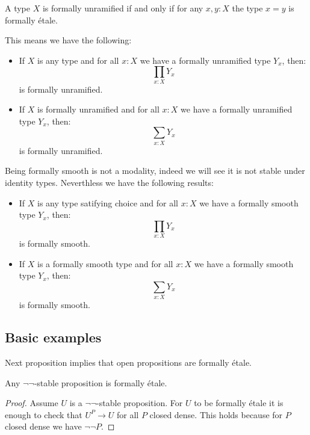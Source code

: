 \begin{lemma}
A type $X$ is formally unramified if and only if for any $x,y:X$ the type $x=y$ is formally étale.
\end{lemma}

This means we have the following:

\begin{proposition}
\begin{itemize}
\item If $X$ is any type and for all $x:X$ we have a formally unramified type $Y_x$, then:
\[\prod_{x:X}Y_x\]
is formally unramified. 
\item  If $X$ is formally unramified and for all $x:X$ we have a formally unramified type $Y_x$, then:
\[\sum_{x:X}Y_x\]
is formally unramified.
\end{itemize}
\end{proposition}

Being formally smooth is not a modality, indeed we will see it is not stable under identity types. Neverthless we have the following results:

\begin{lemma}
\begin{itemize}
\item If $X$ is any type satifying choice and for all $x:X$ we have a formally smooth type $Y_x$, then:
\[\prod_{x:X}Y_x\]
is formally smooth.
\item If $X$ is a formally smooth type and for all $x:X$ we have a formally smooth type $Y_x$, then:
\[\sum_{x:X}Y_x\]
is formally smooth.
\end{itemize}
\end{lemma}


\subsection{Basic examples}

Next proposition implies that open propositions are formally étale.

\begin{lemma}\label{not-not-stable-prop-etale}
  Any $\neg\neg$-stable proposition is formally étale.
\end{lemma}

\begin{proof}
  Assume $U$ is a $\neg\neg$-stable proposition. For $U$ to be formally étale it is enough to check that $U^P\to U$ for all $P$ closed dense. This holds because for $P$ closed dense we have $\neg\neg P$.
  \end{proof}
  
